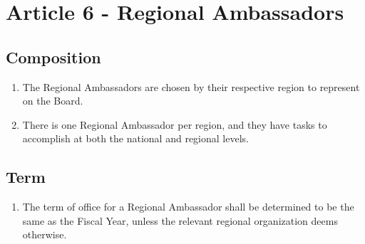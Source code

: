 \section{Article 6 - Regional Ambassadors}
\label{article-6-regional-ambassadors}

\subsection{Composition}
\label{composition-regional-ambassadors}

\begin{enumerate}
 \item The Regional Ambassadors are chosen by their respective region to represent on the Board.
 \item There is one Regional Ambassador per region, and they have tasks to accomplish at both the national and regional levels.
\end{enumerate}

\subsection{Term}
\label{term-regional-ambassadors}

\begin{enumerate}
 \item The term of office for a Regional Ambassador shall be determined to be the same as the Fiscal Year, unless the relevant regional organization deems otherwise.
\end{enumerate}
